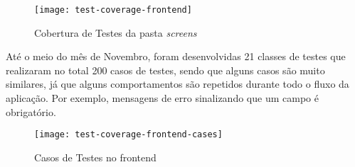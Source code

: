 \begin{figure}[H]
  \centering
  \caption{Cobertura de Testes da pasta \textit{screens}}
  \label{fig:test-coverage-frontend}
  \texttt{[image: test-coverage-frontend]}
\end{figure}

Até o meio do mês de Novembro, foram desenvolvidas 21 classes de testes que realizaram no total 200 casos de testes, sendo que alguns casos são muito similares, já que alguns comportamentos são repetidos durante todo o fluxo da aplicação. Por exemplo, mensagens de erro sinalizando que um campo é obrigatório.

\begin{figure}[H]
  \centering
  \caption{Casos de Testes no \gls{frontend}}
  \label{fig:test-coverage-frontend-cases}
  \texttt{[image: test-coverage-frontend-cases]}
\end{figure}